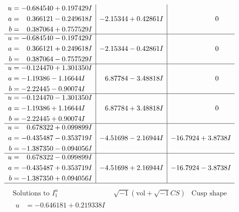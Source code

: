 \documentclass[1p]{elsarticle_modified}
\theoremstyle{definition}
\newcommand{\I}{\sqrt{-1}}
\begin{document}
$$\begin{array}{c|c|c}
\begin{aligned}
u &= -0.684540 + 0.197429 I \\
a &= \phantom{-}0.366121 - 0.249618 I \\
b &= \phantom{-}0.387064 + 0.757529 I\end{aligned}
 & -2.15344 + 0.42861 I & \phantom{-0.000000 } 0 \\ \hline\begin{aligned}
u &= -0.684540 - 0.197429 I \\
a &= \phantom{-}0.366121 + 0.249618 I \\
b &= \phantom{-}0.387064 - 0.757529 I\end{aligned}
 & -2.15344 - 0.42861 I & \phantom{-0.000000 } 0 \\ \hline\begin{aligned}
u &= -0.124470 + 1.301350 I \\
a &= -1.19386 - 1.16644 I \\
b &= -2.22445 - 0.90074 I\end{aligned}
 & \phantom{-}6.87784 - 3.48818 I & \phantom{-0.000000 } 0 \\ \hline\begin{aligned}
u &= -0.124470 - 1.301350 I \\
a &= -1.19386 + 1.16644 I \\
b &= -2.22445 + 0.90074 I\end{aligned}
 & \phantom{-}6.87784 + 3.48818 I & \phantom{-0.000000 } 0 \\ \hline\begin{aligned}
u &= \phantom{-}0.678322 + 0.099899 I \\
a &= -0.435487 - 0.353719 I \\
b &= -1.387350 - 0.094056 I\end{aligned}
 & -4.51698 - 2.16944 I & -16.7924 + 3.8738 I \\ \hline\begin{aligned}
u &= \phantom{-}0.678322 - 0.099899 I \\
a &= -0.435487 + 0.353719 I \\
b &= -1.387350 + 0.094056 I\end{aligned}
 & -4.51698 + 2.16944 I & -16.7924 - 3.8738 I\\
 \hline 
 \end{array}$$\newpage$$\begin{array}{c|c|c}  
\text{Solutions to }I^u_{1}& \I (\text{vol} + \sqrt{-1}CS) & \text{Cusp shape}\\
 \hline 
\begin{aligned}
u &= -0.646181 + 0.219338 I \\

\end{aligned}
\end{array}$$
\end{document}
